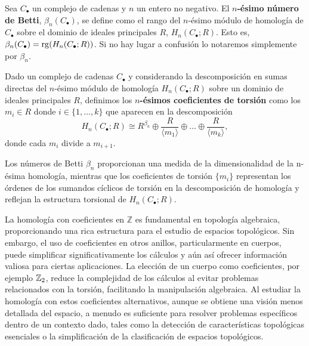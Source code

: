 \begin{definicion}
	Sea $C_{\bullet}$ un complejo de cadenas y $n$ un entero no negativo. El
	\textbf{$n$-ésimo número de Betti}, $\beta_{n}(C_{\bullet})$, se define como el
	rango del $n$-ésimo módulo de homología de $C_{\bullet}$ sobre el dominio de ideales
	principales $R$, $H_{n}(C_{\bullet};R)$. Esto es,
	$\beta_{n}(C_{\bullet}) = \operatorname{rg}(H_{n}(C_{\bullet};R))$. Si no hay lugar a confusión
	lo notaremos simplemente por $\beta_{n}$.
\end{definicion}

\begin{definicion}
	Dado un complejo de cadenas $C_{\bullet}$ y considerando la descomposición en sumas
	directas del $n$-ésimo módulo de homología $H_{n}(C_{\bullet};R)$ sobre un dominio
	de ideales principales $R$, definimos los \textbf{$n$-ésimos coeficientes de
		torsión} como los $m_{i}\in R$ donde $i \in \{1, \ldots, k\}$ que aparecen en la
	descomposición
	\[
	H_{n}(C_{\bullet};R) \cong R^{\beta_n}\oplus \frac{R}{\langle m_{1}\rangle}\oplus
	\ldots \oplus \frac{R}{\langle m_{k}\rangle},
	\]
	donde cada $m_{i}$ divide a $m_{i+1}$.
\end{definicion}

Los números de Betti $\beta_{n}$ proporcionan una medida de la dimensionalidad
de la n-ésima homología, mientras que los coeficientes de torsión $\{m_{i}\}$ representan
los órdenes de los sumandos cíclicos de torsión en la descomposición de homología
y reflejan la estructura torsional de $H_{n}(C_{\bullet};R)$.

La homología con coeficientes en $\mathbb{Z}$ es fundamental en topología algebraica,
proporcionando una rica estructura para el estudio de espacios topológicos. Sin embargo,
el uso de coeficientes en otros anillos, particularmente en cuerpos, puede
simplificar significativamente los cálculos y aún así ofrecer información
valiosa para ciertas aplicaciones. La elección de un cuerpo como coeficientes,
por ejemplo $\mathbb{Z}_{2}$, reduce la complejidad de los cálculos al evitar problemas relacionados
con la torsión, facilitando la manipulación algebraica. Al estudiar la homología
con estos coeficientes alternativos, aunque se obtiene una visión menos
detallada del espacio, a menudo es suficiente para resolver problemas específicos
dentro de un contexto dado, tales como la detección de características
topológicas esenciales o la simplificación de la clasificación de espacios
topológicos.

\endinput
